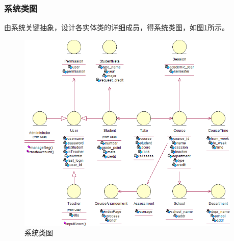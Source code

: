 \subsubsection{系统类图}
由系统关键抽象，设计各实体类的详细成员，得系统类图，如图\ref{fig:system_class}所示。
\begin{figure}[htbp]
  \centering
  \includegraphics[width=0.95\textwidth]{img/system_class}
  \caption{系统类图}
  \label{fig:system_class}
\end{figure}
